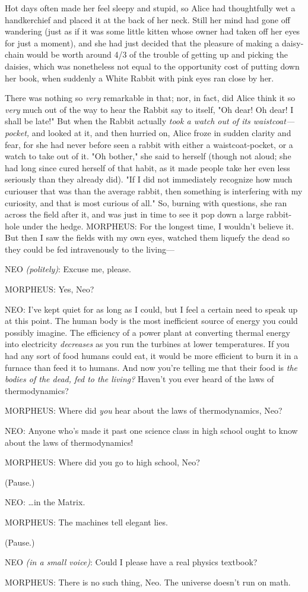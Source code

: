 Hot days often made her feel sleepy and stupid, so Alice had thoughtfully wet a 
handkerchief and placed it at the back of her neck. Still her mind had gone off 
wandering (just as if it was some little kitten whose owner had taken off her 
eyes for just a moment), and she had just decided that the pleasure of making a 
daisy-chain would be worth around 4/3 of the trouble of getting up and picking 
the daisies, which was nonetheless not equal to the opportunity cost of putting 
down her book, when suddenly a White Rabbit with pink eyes ran close by her.

There was nothing so \emph{very} remarkable in that; nor, in fact, did Alice 
think it so\emph{ very} much out of the way to hear the Rabbit say to itself, 
"Oh dear! Oh dear! I shall be late!" But when the Rabbit actually \emph{took a 
watch out of its waistcoat---pocket,} and looked at it, and then hurried on, 
Alice froze in sudden clarity and fear, for she had never before seen a rabbit 
with either a waistcoat-pocket, or a watch to take out of it. "Oh bother," she 
said to herself (though not aloud; she had long since cured herself of that 
habit, as it made people take her even less seriously than they already did). 
"If I did not immediately recognize how much curiouser that was than the 
average rabbit, then something is interfering with my curiosity, and that is 
most curious of all." So, burning with questions, she ran across the field 
after it, and was just in time to see it pop down a large rabbit-hole under the 
hedge.
\sbreak
MORPHEUS: For the longest time, I wouldn't believe it. But then I saw the 
fields with my own eyes, watched them liquefy the dead so they could be fed 
intravenously to the living---

NEO \emph{(politely)}: Excuse me, please.

MORPHEUS: Yes, Neo?

NEO: I've kept quiet for as long as I could, but I feel a certain need to speak 
up at this point. The human body is the most inefficient source of energy you 
could possibly imagine. The efficiency of a power plant at converting thermal 
energy into electricity \emph{decreases} as you run the turbines at lower 
temperatures. If you had any sort of food humans could eat, it would be more 
efficient to burn it in a furnace than feed it to humans. And now you're 
telling me that their food is \emph{the bodies of the dead, fed to the living?} 
Haven't you ever heard of the laws of thermodynamics?

MORPHEUS: Where did \emph{you} hear about the laws of thermodynamics, Neo?

NEO: Anyone who's made it past one science class in high school ought to know 
about the laws of thermodynamics!

MORPHEUS: Where did you go to high school, Neo?

(Pause.)

NEO: {\ldots}in the Matrix.

MORPHEUS: The machines tell elegant lies.

(Pause.)

NEO \emph{(in a small voice)}: Could I please have a real physics textbook?

MORPHEUS: There is no such thing, Neo. The universe doesn't run on math.

